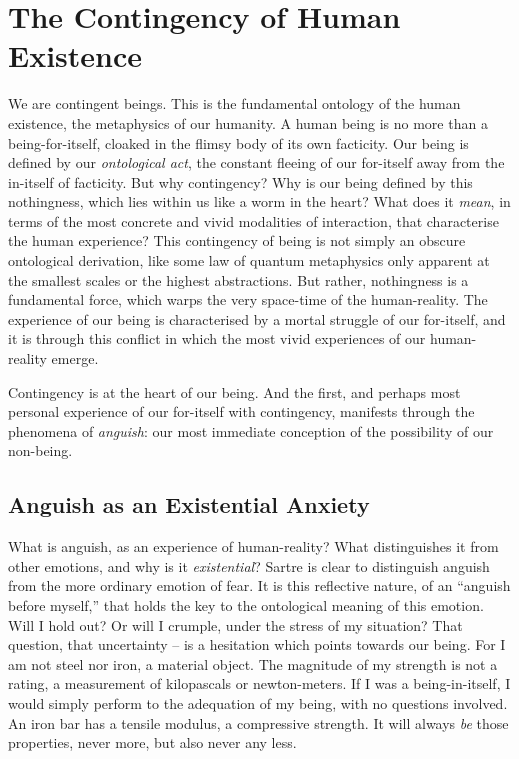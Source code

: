 \chapter{The Contingency of Human Existence}

We are contingent beings. This is the fundamental ontology of the human existence, the metaphysics of our humanity. A human being is no more than a being-for-itself, cloaked in the flimsy body of its own facticity. Our being is defined by our \emph{ontological act}, the constant fleeing of our for-itself away from the in-itself of facticity. But why contingency? Why is our being defined by this nothingness, which lies within us like a worm in the heart? What does it \emph{mean}, in terms of the most concrete and vivid modalities of interaction, that characterise the human experience? This contingency of being is not simply an obscure ontological derivation, like some law of quantum metaphysics only apparent at the smallest scales or the highest abstractions. But rather, nothingness is a fundamental force, which warps the very space-time of the human-reality. The experience of our being is characterised by a mortal struggle of our for-itself, and it is through this conflict in which the most vivid experiences of our human-reality emerge. 

Contingency is at the heart of our being. And the first, and perhaps most personal experience of our for-itself with contingency, manifests through the phenomena of \emph{anguish}: our most immediate conception of the possibility of our non-being.

\section{Anguish as an Existential Anxiety}

What is anguish, as an experience of human-reality? What distinguishes it from other emotions, and why is it \emph{existential}?
Sartre is clear to distinguish anguish from the more ordinary emotion of fear.  It is this reflective nature, of an \enquote{anguish before myself,} that holds the key to the ontological meaning of this emotion.
Will I hold out? Or will I crumple, under the stress of my situation?
That question, that uncertainty -- is a hesitation which points towards our being. For I am not steel nor iron, a material object.
The magnitude of my strength is not a rating, a measurement of kilopascals or newton-meters. If I was a being-in-itself, I would simply perform to the adequation of my being, with no questions involved. An iron bar has a tensile modulus, a compressive strength. It will always \emph{be} those properties, never more, but also never any less.

